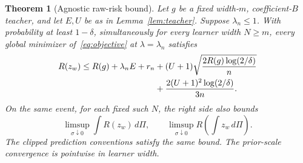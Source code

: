 \documentclass[11pt]{article}
\newtheorem{theorem}{Theorem}[section]\newtheorem{lemma}[theorem]{Lemma}
\theoremstyle{remark}\newtheorem{remark}[theorem]{Remark}
\newcommand{\Risk}{R}\newcommand{\empRisk}{\widehat R}
\begin{document}
\begin{theorem}[Agnostic raw-risk bound]
\label{thm:upper}
Let $g$ be a fixed width-$m$, coefficient-$B$ teacher, and let $E,U$ be as in Lemma~\ref{lem:teacher}. Suppose $\lambda_n\le1$. With probability at least $1-\delta$, simultaneously for every learner width $N\ge m$, every global minimizer of~\eqref{eq:objective} at $\lambda=\lambda_n$ satisfies
\begin{align}
 \Risk(z_w)\le\Risk(g)+\lambda_nE+r_n
 &+(U+1)\sqrt{\frac{2\Risk(g)\log(2/\delta)}n}\notag\\
 &+\frac{2(U+1)^2\log(2/\delta)}{3n}.
 \label{eq:oracle}
\end{align}
On the same event, for each fixed such $N$, the right side also bounds
\[
 \limsup_{\sigma\downarrow0}\int\Risk(z_w)\,d\Pi,
 \qquad
 \limsup_{\sigma\downarrow0}\Risk\left(\int z_w\,d\Pi\right).
\]
The clipped prediction conventions satisfy the same bound. The prior-scale convergence is pointwise in learner width.
\end{theorem}
\end{document}
